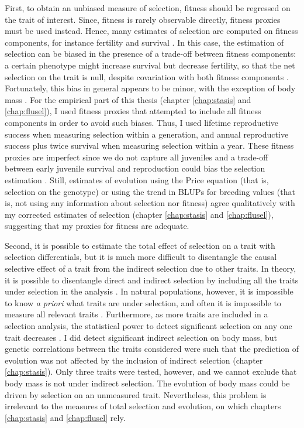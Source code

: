 First, to obtain an unbiased measure of selection, fitness should be regressed on the trait of interest. Since, fitness is rarely observable directly, fitness proxies must be used instead. Hence, many estimates of selection are computed on fitness components, for instance fertility and survival \parencite{Kingsolver2012}. In this case, the estimation of selection can be biased in the presence of a trade-off between fitness components: a certain phenotype might increase survival but decrease fertility, so that the net selection on the trait is null, despite covariation with both fitness components \parencite{Thompson2011, Kingsolver2012, Brookfield2016}. Fortunately, this bias in general appears to be minor, with the exception of body mass \parencite{Kingsolver2011}.
For the empirical part of this thesis (chapter \ref{chap:stasis} and \ref{chap:flusel}), I used fitness proxies that attempted to include all fitness components in order to avoid such biases. Thus, I used lifetime reproductive success when measuring selection within a generation, and annual reproductive success plus twice survival when measuring selection within a year. These fitness proxies are imperfect since we do not capture all juveniles and a trade-off between early juvenile survival and reproduction could bias the selection estimation \parencite{Hadfield2008}. Still, estimates of evolution using the Price equation (that is, selection on the genotype) or using the trend in BLUPs for breeding values (that is, not using any information about selection nor fitness) agree qualitatively with my corrected estimates of selection (chapter \ref{chap:stasis} and \ref{chap:flusel}), suggesting that my proxies for fitness are adequate. 

Second, it is possible to estimate the total effect of selection on a trait with selection differentials, but it is much more difficult to disentangle the causal selective effect of a trait from the indirect selection due to other traits. In theory, it is possible to disentangle direct and indirect selection by including all the traits under selection in the analysis \parencite{Lande1983}. In natural populations, however, it is impossible to know \emph{a priori} what traits are under selection, and often it is impossible to measure all relevant traits \parencite{Brookfield2016, Hadfield2008}. Furthermore, as more traits are included in a selection analysis, the statistical power to detect significant selection on any one trait decreases \parencite{Mitchell-Olds1987}.
I did detect significant indirect selection on body mass, but genetic correlations between the traits considered were such that the prediction of evolution was not affected by the inclusion of indirect selection (chapter \ref{chap:stasis}). Only three traits were tested, however, and we cannot exclude that body mass is not under indirect selection. The evolution of body mass could be driven by selection on an unmeasured trait.
Nevertheless, this problem is irrelevant to the measures of total selection and evolution, on which chapters \ref{chap:stasis} and \ref{chap:flusel} rely.

